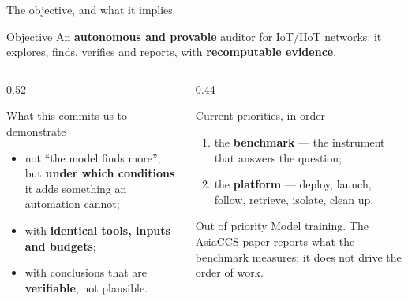 \documentclass[aspectratio=169,10pt]{beamer}
\begin{document}
\begin{frame}{The objective, and what it implies}

  \begin{exampleblock}{Objective}
    An \textbf{autonomous and provable} auditor for IoT/IIoT networks: it
    explores, finds, verifies and reports, with \textbf{recomputable evidence}.
  \end{exampleblock}

  \vspace{0.2em}
  \begin{columns}[T,onlytextwidth]
    \begin{column}{0.52\textwidth}
      \begin{block}{What this commits us to demonstrate}
        \begin{itemize}
          \item not ``the model finds more'', but \textbf{under which
                conditions} it adds something an automation cannot;
          \item with \textbf{identical tools, inputs and budgets};
          \item with conclusions that are \textbf{verifiable}, not plausible.
        \end{itemize}
      \end{block}
    \end{column}
    \begin{column}{0.44\textwidth}
      \begin{block}{Current priorities, in order}
        \begin{enumerate}
          \item the \textbf{benchmark} --- the instrument that answers the
                question;
          \item the \textbf{platform} --- deploy, launch, follow, retrieve,
                isolate, clean up.
        \end{enumerate}
      \end{block}
      \begin{alertblock}{Out of priority}
        \small Model training. The AsiaCCS paper reports what the benchmark
        measures; it does not drive the order of work.
      \end{alertblock}
    \end{column}
  \end{columns}

\end{frame}
\end{document}
